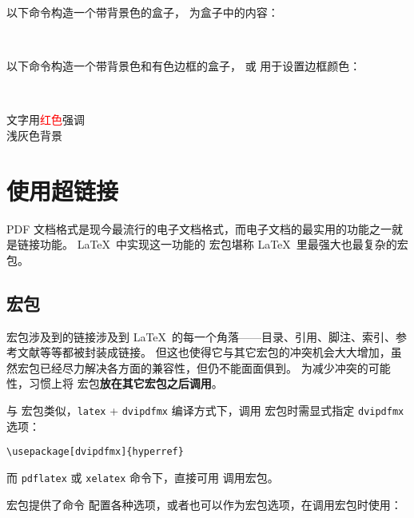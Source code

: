 以下命令构造一个带背景色的盒子， 为盒子中的内容：
\begin{command}
 \\
\end{command}

以下命令构造一个带背景色和有色边框的盒子， 或  用于设置边框颜色：
\begin{command}
 \\
\end{command}

\begin{example}
\sffamily
文字用\textcolor{red}{红色}强调\\
\colorbox[gray]{0.95}{浅灰色背景} \\
\end{example}

\section{使用超链接}

PDF 文档格式是现今最流行的电子文档格式，而电子文档的最实用的功能之一就是链接功能。
\LaTeX\ 中实现这一功能的  宏包堪称 \LaTeX\ 里最强大也最复杂的宏包。

\subsection{ 宏包}

 宏包涉及到的链接涉及到 \LaTeX\ 的每一个角落——目录、引用、脚注、索引、参考文献等等都被封装成链接。
但这也使得它与其它宏包的冲突机会大大增加，虽然宏包已经尽力解决各方面的兼容性，但仍不能面面俱到。
为减少冲突的可能性，习惯上将  宏包\textbf{放在其它宏包之后调用}。

与  宏包类似，\texttt{latex} + \texttt{dvipdfmx} 编译方式下，调用  宏包时需显式指定 \texttt{dvipdfmx} 选项：
\begin{verbatim}
\usepackage[dvipdfmx]{hyperref}
\end{verbatim}
而 \texttt{pdflatex} 或 \texttt{xelatex} 命令下，直接可用  调用宏包。

 宏包提供了命令  配置各种选项，或者也可以作为宏包选项，在调用宏包时使用：
\begin{command}
 \\
\end{command}

